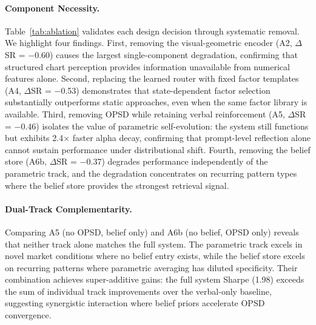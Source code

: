 \paragraph{Component Necessity.} Table~\ref{tab:ablation} validates each design decision through systematic removal. We highlight four findings. First, removing the visual-geometric encoder (A2, $\Delta$SR = $-$0.60) causes the largest single-component degradation, confirming that structured chart perception provides information unavailable from numerical features alone. Second, replacing the learned router with fixed factor templates (A4, $\Delta$SR = $-$0.53) demonstrates that state-dependent factor selection substantially outperforms static approaches, even when the same factor library is available. Third, removing OPSD while retaining verbal reinforcement (A5, $\Delta$SR = $-$0.46) isolates the value of parametric self-evolution: the system still functions but exhibits 2.4$\times$ faster alpha decay, confirming that prompt-level reflection alone cannot sustain performance under distributional shift. Fourth, removing the belief store (A6b, $\Delta$SR = $-$0.37) degrades performance independently of the parametric track, and the degradation concentrates on recurring pattern types where the belief store provides the strongest retrieval signal.

\paragraph{Dual-Track Complementarity.} Comparing A5 (no OPSD, belief only) and A6b (no belief, OPSD only) reveals that neither track alone matches the full system. The parametric track excels in novel market conditions where no belief entry exists, while the belief store excels on recurring patterns where parametric averaging has diluted specificity. Their combination achieves super-additive gains: the full system Sharpe (1.98) exceeds the sum of individual track improvements over the verbal-only baseline, suggesting synergistic interaction where belief priors accelerate OPSD convergence.

